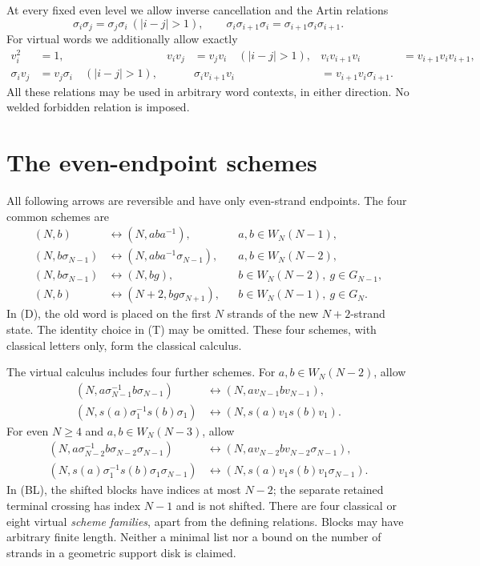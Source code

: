 \documentclass[11pt]{article}
\newcommand{\sig}{\sigma}
\newcommand{\arr}{\longleftrightarrow}
\newcommand{\WB}[2]{W_{#1}(#2)}
\begin{document}
At every fixed even level we allow inverse cancellation and the Artin relations
\[
 \sig_i\sig_j=\sig_j\sig_i\ (|i-j|>1),\qquad
 \sig_i\sig_{i+1}\sig_i=\sig_{i+1}\sig_i\sig_{i+1}.
\]
For virtual words we additionally allow exactly
\begin{align*}
 v_i^2&=1,&v_i v_j&=v_j v_i\quad(|i-j|>1),&
 v_i v_{i+1}v_i&=v_{i+1}v_i v_{i+1},\\
 \sig_i v_j&=v_j\sig_i\quad(|i-j|>1),&&
 \sig_i v_{i+1}v_i&=v_{i+1}v_i\sig_{i+1}.
\end{align*}
All these relations may be used in arbitrary word contexts, in either direction.
No welded forbidden relation is imposed.

\section{The even-endpoint schemes}
All following arrows are reversible and have only even-strand endpoints.
The four common schemes are
\begin{align}
 (N,b)&\arr(N,aba^{-1}), && a,b\in\WB{N}{N-1}, \tag{C}\label{C}\\
 (N,b\sig_{N-1})&\arr(N,aba^{-1}\sig_{N-1}),
 &&a,b\in\WB{N}{N-2}, \tag{BC}\label{BC}\\
 (N,b\sig_{N-1})&\arr(N,bg),
 &&b\in\WB{N}{N-2},\ g\in G_{N-1}, \tag{T}\label{T}\\
 (N,b)&\arr(N+2,bg\sig_{N+1}),
 &&b\in\WB{N}{N-1},\ g\in G_N. \tag{D}\label{D}
\end{align}
In (D), the old word is placed on the first $N$ strands of the new $N+2$-strand
state. The identity choice in (T) may be omitted. These four schemes,
with classical letters only, form the classical calculus.

The virtual calculus includes four further schemes. For
$a,b\in\WB{N}{N-2}$, allow
\begin{align}
 (N,a\sig_{N-1}^{-1}b\sig_{N-1})
 &\arr(N,av_{N-1}bv_{N-1}), \tag{R}\label{R}\\
 (N,s(a)\sig_1^{-1}s(b)\sig_1)
 &\arr(N,s(a)v_1s(b)v_1). \tag{L}\label{L}
\end{align}
For even $N\ge4$ and $a,b\in\WB{N}{N-3}$, allow
\begin{align}
 (N,a\sig_{N-2}^{-1}b\sig_{N-2}\sig_{N-1})
 &\arr(N,av_{N-2}bv_{N-2}\sig_{N-1}), \tag{BR}\label{BR}\\
 (N,s(a)\sig_1^{-1}s(b)\sig_1\sig_{N-1})
 &\arr(N,s(a)v_1s(b)v_1\sig_{N-1}). \tag{BL}\label{BL}
\end{align}
In (BL), the shifted blocks have indices at most $N-2$; the separate retained
terminal crossing has index $N-1$ and is not shifted.
There are four classical or eight virtual \emph{scheme families}, apart from the
defining relations. Blocks may have arbitrary finite length. Neither a minimal
list nor a bound on the number of strands in a geometric support disk is claimed.
\end{document}
